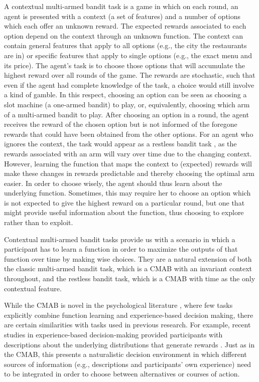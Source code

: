 \documentclass[a4paper,natbib]{apa6}
\begin{document}
A contextual multi-armed bandit task is a game in which on each round, an agent is presented with a context (a set of features) and a number of options which each offer an unknown reward. The expected rewards associated to each option depend on the context through an unknown function. The context can contain general features that apply to all options (e.g., the city the restaurants are in) or specific features that apply to single options (e.g., the exact menu and its price). The agent's task is to choose those options that will accumulate the highest reward over all rounds of the game. The rewards are stochastic, such that even if the agent had complete knowledge of the task, a choice would still involve a kind of gamble. In this respect, choosing an option can be seen as choosing a slot machine (a one-armed bandit) to play, or, equivalently, choosing which arm of a multi-armed bandit to play. After choosing an option in a round, the agent receives the reward of the chosen option but is not informed of the foregone rewards that could have been obtained from the other options. For an agent who ignores the context, the task would appear as a restless bandit task \citep[e.g.,][]{speekenbrinkuncertainty}, as the rewards associated with an arm will vary over time due to the changing context. However, learning the function that maps the context to (expected) rewards will make these changes in rewards predictable and thereby choosing the optimal arm easier. In order to choose wisely, the agent should thus learn about the underlying function. Sometimes, this may require her to choose an option which is not expected to give the highest reward on a particular round, but one that might provide useful information about the function, thus choosing to explore rather than to exploit. 

Contextual multi-armed bandit tasks provide us with a scenario in which a participant has to learn a function in order to maximize the outputs of that function over time by making wise choices. They are a natural extension of both the classic multi-armed bandit task, which is a CMAB with an invariant context throughout, and the restless bandit task, which is a CMAB with time as the only contextual feature. 

While the CMAB is novel in the psychological literature \citep[though see][]{schulz2015exploration,stojic2015human}, where few tasks explicitly combine function learning and experience-based decision making, there are certain similarities with tasks used in previous research. For example, recent studies in experience-based decision-making provided participants with descriptions about the underlying distributions that generate rewards \citep[e.g.,][]{Lejarraga2011,weiss2016incorporating}. Just as in the CMAB, this presents a naturalistic decision environment in which different sources of information (e.g., descriptions and participants' own experience) need to be integrated in order to choose between alternatives or courses of action. 
\end{document}
